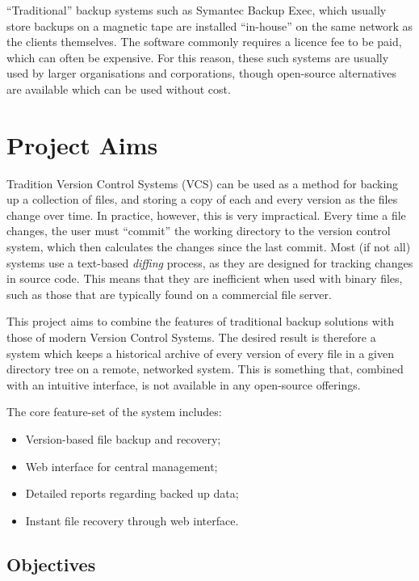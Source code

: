 ``Traditional'' backup systems such as Symantec Backup Exec, which usually
store backups on a magnetic tape are installed ``in-house'' on the same network
as the clients themselves. The software commonly requires a licence fee to be
paid, which can often be expensive. For this reason, these such systems are
usually used by larger organisations and corporations, though open-source
alternatives are available which can be used without cost.

\section{Project Aims}
\label{sec:introduction-aims}

Tradition Version Control Systems (VCS) can be used as a method for backing up
a collection of files, and storing a copy of each and every version as the
files change over time. In practice, however, this is very impractical. Every
time a file changes, the user must ``commit'' the working directory to the
version control system, which then calculates the changes since the last
commit. Most (if not all) systems use a text-based \emph{diffing} process, as
they are designed for tracking changes in source code. This means that they are
inefficient when used with binary files, such as those that are typically found
on a commercial file server.

This project aims to combine the features of traditional backup solutions with
those of modern Version Control Systems. The desired result is therefore
a system which keeps a historical archive of every version of every file in
a given directory tree on a remote, networked system. This is something that,
combined with an intuitive interface, is not available in any open-source
offerings.

The core feature-set of the system includes:

\begin{itemize}
    \item Version-based file backup and recovery;
    \item Web interface for central management;
    \item Detailed reports regarding backed up data;
    \item Instant file recovery through web interface.
\end{itemize}

\subsection{Objectives}

